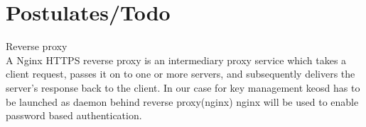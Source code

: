 \documentclass[]{article}
\begin{document}
\section{Postulates/Todo}


	\item Reverse proxy \\
	A Nginx HTTPS reverse proxy is an intermediary proxy service which takes a client request, passes it on to one or more servers, and subsequently delivers the server's response back to the client. 
	In our case for key management keosd has to be launched as daemon behind reverse proxy(nginx)
	nginx will be used to enable password based authentication.
\end{document}
